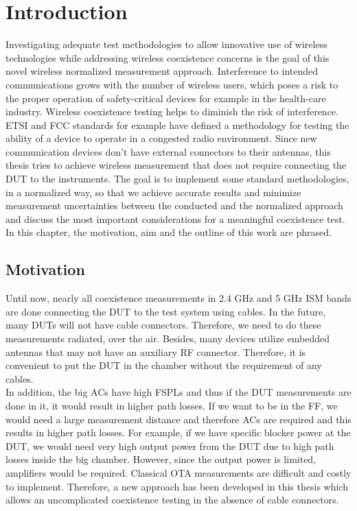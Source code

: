 \chapter{Introduction}
Investigating adequate test methodologies to allow innovative use of wireless technologies while addressing wireless coexistence concerns is the goal of this novel wireless normalized measurement approach. Interference to intended communications grows with the number of wireless users, which poses a risk to the proper operation of safety-critical devices for example in the health-care industry. Wireless coexistence testing helps to diminish the risk of interference. \acf{ETSI} and \acf{FCC} standards for example have defined a methodology for testing the ability of a device to operate in a congested radio environment. Since new communication devices don't have external connectors to their antennas, this thesis tries to achieve wireless measurement that does not require connecting the \acf{DUT} to the instruments. The goal is to implement some standard methodologies, in a normalized way, so that we achieve accurate results and minimize measurement uncertainties between the conducted and the normalized approach and discuss the most important considerations for a meaningful coexistence test. In this chapter, the motivation, aim and the outline of this work are phrased.

\section{Motivation}
Until now, nearly all coexistence measurements in 2.4 GHz and 5 GHz \ac{ISM}  bands are done connecting the \acs{DUT} to the test system using cables. In the future, many \acsp{DUT} will not have cable connectors. Therefore, we need to do these measurements radiated, over the air. Besides, many devices utilize embedded antennas that may not have an auxiliary \acs{RF} connector. Therefore, it is convenient to put the \acs{DUT} in the chamber without the requirement of any cables. \\

In addition, the big  \acp{AC} have high \acfp{FSPL} and thus if the \acs{DUT} measurements are done in it, it would result in higher path losses. If we want to be in the \acf{FF}, we would need a large measurement distance and therefore \acfp{AC} are required and this results in higher path losses. For example, if we have specific blocker power at the \acs{DUT}, we would need very high output power from the \acs{DUT} due to high path losses inside the big chamber. However, since the output power is limited, amplifiers would be required. Classical \ac{OTA} measurements are difficult and costly to implement. Therefore, a new approach has been developed in this thesis which allows an uncomplicated coexistence testing in the absence of cable connectors. 


